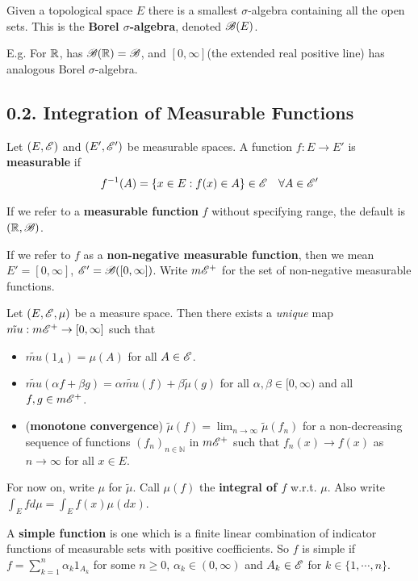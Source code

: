 \documentclass[12pt,a4paper]{report}
\begin{document}
Given a topological space $E$ there is a smallest $\sigma$-algebra containing all the open sets. This is the \textbf{Borel $\sigma$-algebra}, denoted $\mathscr{B}(E)$.
\s

E.g. For $\mathbb{R}$, has $\mathscr{B}(\mathbb{R}) = \mathscr{B}$, and $[0,\infty]$(the extended real positive line) has analogous Borel $\sigma$-algebra.
\s

\subsection*{0.2. Integration of Measurable Functions}

Let $(E, \mathscr{E})$ and $(E', \mathscr{E}')$ be measurable spaces. A function $f: E \rightarrow E'$ is \textbf{measurable} if
\begin{align*}
f^{-1}(A) = \{ x\in E : f(x) \in A \} \in \mathscr{E} \quad \forall A \in \mathscr{E}'
\end{align*}

If we refer to a \textbf{measurable function} $f$ without specifying range, the default is $(\mathbb{R}, \mathscr{B})$. 
\s

If we refer to $f$ as a \textbf{non-negative measurable function}, then we mean $E' = [0, \infty]$, $\mathscr{E}' = \mathscr{B}([0,\infty])$. Write $m\mathscr{E}^+$ for the set of non-negative measurable functions.
\s

 Let $(E,\mathscr{E}, \mu)$ be a measure space. Then there exists a \textit{unique} map $\tilde{mu} : m \mathscr{E}^+ \rightarrow [0,\infty]$ such that
\begin{itemize}
\item[(a)] $\tilde{mu}(1_A) = \mu(A)$ for all $A \in \mathscr{E}$.
\item[(b)] $\tilde{mu}(\alpha f + \beta g)= \alpha \tilde{mu}(f) + \beta \tilde{\mu}(g)$ for all $\alpha, \beta \in [0,\infty)$ and all $f,g \in m \mathscr{E}^+$.
\item[(c)] (\textbf{monotone convergence}) $\tilde{\mu}(f) = \lim_{n\rightarrow \infty} \tilde{\mu}(f_n)$ for a non-decreasing sequence of functions $(f_n)_{n\in \mathbb{N}}$ in $m\mathscr{E}^+$ such that $f_n(x) \rightarrow f(x)$ as $n\rightarrow \infty$ for all $x\in E$. 
\end{itemize}
\eos
\s

For now on, write $\mu$ for $\tilde{\mu}$. Call $\mu(f)$ the \textbf{integral of $f$} w.r.t. $\mu$. Also write $\int_E fd\mu = \int_E f(x) \mu(dx)$.
\s

A \textbf{simple function } is one which is a finite linear combination of indicator functions of measurable sets with positive coefficients. So $f$ is simple if $f = \sum_{k=1}^n \alpha_k 1_{A_k}$ for some $n \geq 0$, $\alpha_k \in (0,\infty)$ and $A_k \in \mathscr{E}$ for $k\in \{1,\cdots, n\}$.
\s
\end{document}
